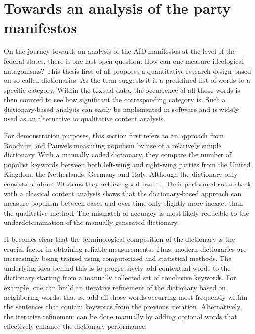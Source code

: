 \documentclass[a4paper]{scrreprt}
\begin{document}
\section{Towards an analysis of the party manifestos}
On the journey towards an analysis of the AfD manifestos at the level of the federal states, there is one last open question: How can one measure ideological antagonisms? This thesis first of all proposes a quantitative research design based on so-called dictionaries. As the term suggests it is a predefined list of words to a specific category. Within the textual data, the occurrence of all those words is then counted to see how significant the corresponding category is. Such a dictionary-based analysis can easily be implemented in software and is widely used as an alternative to qualitative content analysis.\par
For demonstration purposes, this section first refers to an approach from Rooduijn and Pauwels measuring populism by use of a relatively simple dictionary. \citep{rooduijn:2011} With a manually coded dictionary, they compare the number of populist keywords between both left-wing and right-wing parties from the United Kingdom, the Netherlands, Germany and Italy. Although the dictionary only consists of about 20 stems they achieve good results. Their performed cross-check with a classical content analysis shows that the dictionary-based approach can measure populism between cases and over time only slightly more inexact than the qualitative method. The mismatch of accuracy is most likely reducible to the underdetermination of the manually generated dictionary. \cite[p.~1279]{rooduijn:2011}\par
It becomes clear that the terminological composition of the dictionary is the crucial factor in obtaining reliable measurements. Thus, modern dictionaries are increasingly being trained using computerized and statistical methods. The underlying idea behind this is to progressively add contextual words to the dictionary starting from a manually collected set of conclusive keywords. For example, one can build an iterative refinement of the dictionary based on neighboring words: that is, add all those words occurring most frequently within the sentences that contain keywords from the previous iteration. Alternatively, the iterative refinement can be done manually by adding optional words that effectively enhance the dictionary performance.\par
\end{document}
